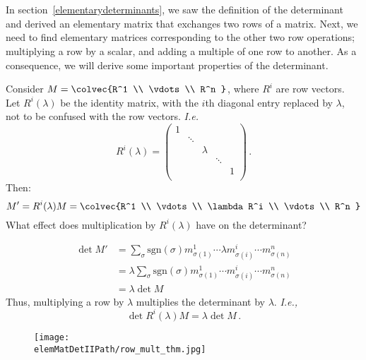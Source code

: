 
\chapter{\elemMatDetIITitle}\label{elementarydeterminantsII}

In section~\ref{elementarydeterminants}, we saw the definition of the determinant and derived an elementary matrix that exchanges two rows of a matrix.  Next, we need to find elementary matrices corresponding to the other two row operations; multiplying a row by a scalar, and adding a multiple of one row to another.  As a consequence, we will derive some important properties of the determinant.

Consider $M=\colvec{R^1 \\ \vdots \\ R^n }$, where $R^i$ are row vectors.  Let $R^i(\lambda)$ be the identity matrix, with the $i$th diagonal entry replaced by $\lambda$, not to be confused with the row vectors. {\itshape I.e.}
\[
R^i(\lambda)=
\begin{pmatrix}
1 & & & & \\
  & \ddots & & & \\
  & & \lambda & & \\
  & & & \ddots & \\
  & & & & 1 \\
\end{pmatrix}
\, .\]
Then:
\[
M'=R^i(\lambda)M=\colvec{R^1 \\ \vdots \\ \lambda R^i \\ \vdots \\ R^n }
\]
What effect does multiplication by $R^i(\lambda)$ have on the determinant?

\begin{align*}
\det M' & = \sum_{\sigma} \text{sgn}(\sigma) m^1_{\sigma(1)}\cdots \lambda m^i_{\sigma(i)} \cdots m^n_{\sigma(n)} \\
& = \lambda \sum_{\sigma} \text{sgn}(\sigma) m^1_{\sigma(1)}\cdots m^i_{\sigma(i)} \cdots m^n_{\sigma(n)} \\
& = \lambda \det M
\end{align*}
Thus, multiplying a row by $\lambda$ multiplies the determinant by $\lambda$.
{\itshape I.e.,} \[\det R^i(\lambda) M = \lambda \det M\, .\]


\begin{figure}
\begin{center}
\texttt{[image: \\elemMatDetIIPath/row\_mult\_thm.jpg]}
\end{center}
\end{figure}


